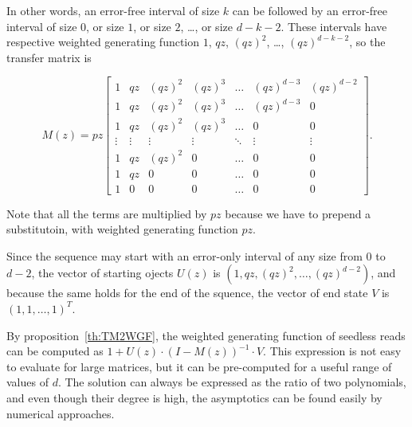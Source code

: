 \documentclass{article}
\begin{document}
In other words, an error-free interval of size $k$ can be followed by an
error-free interval of size $0$, or size $1$, or size $2$, \ldots, or size
$d-k-2$. These intervals have respective weighted generating function $1$,
$qz$, $(qz)^2$, \ldots, $(qz)^{d-k-2}$, so the transfer matrix is

\begin{equation}
M(z) = pz\left[
\begin{matrix}
1 & qz  & (qz)^2 & (qz)^3 & \ldots & (qz)^{d-3} & (qz)^{d-2} \\
1 & qz  & (qz)^2 & (qz)^3 & \ldots & (qz)^{d-3} & 0          \\
1 & qz  & (qz)^2 & (qz)^3 & \ldots & 0          & 0          \\
\vdots & \vdots & \vdots & \vdots & \ddots & \vdots & \vdots \\
1 & qz  & (qz)^2 & 0      & \ldots & 0          & 0          \\
1 & qz  & 0      & 0      & \ldots & 0          & 0          \\
1 & 0   & 0      & 0      & \ldots & 0          & 0
\end{matrix}
\right].
\end{equation}

Note that all the terms are multiplied by $pz$ because we have to prepend
a substitutoin, with weighted generating function $pz$.

Since the sequence may start with an error-only interval of any size from
$0$ to $d-2$, the vector of starting ojects $U(z)$ is $(1, qz, (qz)^2,
\ldots, (qz)^{d-2})$, and because the same holds for the end of the
squence, the vector of end state $V$ is $(1,1, \ldots, 1)^T$.

By proposition~\ref{th:TM2WGF}, the weighted generating function of
seedless reads can be computed as $1+U(z) \cdot (I-M(z))^{-1} \cdot V$.
This expression is not easy to evaluate for large matrices, but it can be
pre-computed for a useful range of values of $d$. The solution can always
be expressed as the ratio of two polynomials, and even though their degree
is high, the asymptotics can be found easily by numerical approaches.
\end{document}
